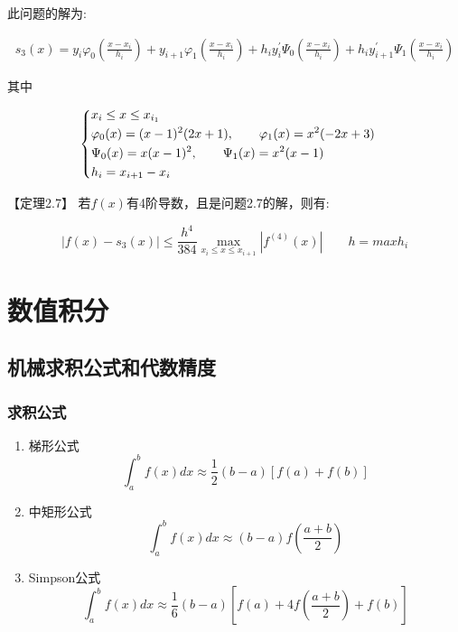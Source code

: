 \documentclass[12pt]{report}
\begin{document}
此问题的解为:

\begin{equation}
	\begin{aligned}
		s_3 (x) = y_i \varphi_0 (\frac{x - x_i}{h_i}) + y_{i+1} \varphi_1 (\frac{x - x_i}{h_i}) + h_i y_i^\prime \Psi_0 (\frac{x - x_i}{h_i}) + h_i y_{i+1}^\prime \Psi_1 (\frac{x - x_i}{h_i})
	\end{aligned}
	\tag{2.18} \label{2.18}
\end{equation}

其中

\begin{equation}
	\begin{cases}
	\begin{aligned}
		&x_i \le x \le x_{i_1}\\
		&\varphi_0(x)=(x-1)^2(2x+1), \qquad \varphi_1(x)=x^2(-2x+3)\\
		&\Psi_0(x)=x(x-1)^2, \qquad \Psi_1(x)=x^2(x-1)\\
		&h_i=x_{i+1}-x_i
	\end{aligned}
	\end{cases}
	\notag
\end{equation}

【定理2.7】 \quad 若$f(x)$有4阶导数，且是问题2.7的解，则有:

\begin{equation}
	|f(x) - s_3 (x)| \leq \frac{h^4}{384} \max_{x_i \leq x \leq x_{i+1}}
	 |f^{(4)}(x)| \quad \quad h = max h_i
	\tag{2.19} \label{2.19}
\end{equation}

\chapter{数值积分}

\section{机械求积公式和代数精度}

\subsection{求积公式}

\begin{enumerate}
	\item 梯形公式
	\[
	\int_{a}^{b} f(x) dx \approx \frac{1}{2} (b - a)\left[f\left(a\right) + f\left(b\right)\right]
	\]
	\item 中矩形公式
	\[
	\int_{a}^{b} f(x) dx \approx \left(b - a\right) f\left(\frac{a+b}{2}\right)
	\]
	\item Simpson公式
	\[
	\int_{a}^{b} f(x) dx \approx \frac{1}{6}\left(b - a\right)\left[f\left(a\right) + 4f\left(\frac{a+b}{2}\right) + f\left(b\right)\right]
	\]
\end{enumerate}
\end{document}
